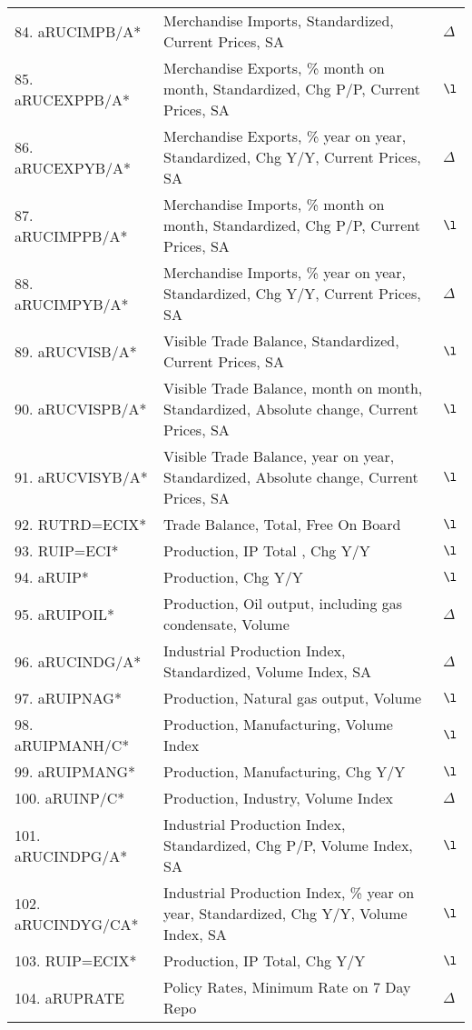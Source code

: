 \documentclass[a4paper, 14pt]{article}
\begin{document}
\begin{center}
\begin{longtable}{p{5.5cm} p{10cm} p{0.15cm}}
	84. aRUCIMPB/A* &  Merchandise Imports, Standardized, Current Prices, SA & $\Delta$\\
	85. aRUCEXPPB/A* &  Merchandise Exports, \% month on month, Standardized, Chg P/P, Current Prices, SA & $\l$\\
	86. aRUCEXPYB/A* &  Merchandise Exports, \% year on year, Standardized, Chg Y/Y, Current Prices, SA & $\Delta$\\
	87. aRUCIMPPB/A* &  Merchandise Imports, \% month on month, Standardized, Chg P/P, Current Prices, SA & $\l$\\
	88. aRUCIMPYB/A* &  Merchandise Imports, \% year on year, Standardized, Chg Y/Y, Current Prices, SA & $\Delta$\\
	89. aRUCVISB/A* &  Visible Trade Balance, Standardized, Current Prices, SA & $\l$\\
	90. aRUCVISPB/A* &  Visible Trade Balance, month on month, Standardized, Absolute change, Current Prices, SA & $\l$\\
	91. aRUCVISYB/A* &  Visible Trade Balance, year on year, Standardized, Absolute change, Current Prices, SA & $\l$\\
	92. RUTRD=ECIX* &  Trade Balance, Total, Free On Board & $\l$\\
	93. RUIP=ECI* &  Production, IP Total , Chg Y/Y & $\l$\\
	94. aRUIP* &  Production, Chg Y/Y & $\l$\\
	95. aRUIPOIL* &  Production, Oil output, including gas condensate, Volume & $\Delta$\\
	96. aRUCINDG/A* &  Industrial Production Index, Standardized, Volume Index, SA & $\Delta$\\
	97. aRUIPNAG* &  Production, Natural gas output, Volume & $\l$\\
	98. aRUIPMANH/C* &  Production, Manufacturing, Volume Index & $\l$\\
	99. aRUIPMANG* &  Production, Manufacturing, Chg Y/Y & $\l$\\
	100. aRUINP/C* &  Production, Industry, Volume Index & $\Delta$\\
	101. aRUCINDPG/A* &  Industrial Production Index, Standardized, Chg P/P, Volume Index, SA & $\l$\\
	102. aRUCINDYG/CA* &  Industrial Production Index, \% year on year, Standardized, Chg Y/Y, Volume Index, SA & $\l$\\
	103. RUIP=ECIX* &  Production, IP Total, Chg Y/Y & $\l$\\
	104. aRUPRATE &  Policy Rates, Minimum Rate on 7 Day Repo & $\Delta$\\

\end{longtable}
\end{center}
\end{document}

